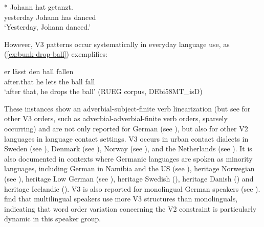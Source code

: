 \documentclass[output=paper,colorlinks,citecolor=brown]{langscibook}
\begin{document}
\begin{exe}
 \ex \label{ex:bunk-Johann-danced} {*} {
  {Johann} {hat} {getanzt.} \\
 yesterday  Johann  has  danced  \\
 \glt \hspace{0.25cm} ‘Yesterday, Johann danced.’ \citep[137]{roberts_extended_2002}
 }
\end{exe}

However, V3 patterns occur systematically in everyday language use, as (\ref{ex:bunk-drop-ball}) exemplifies:  

\begin{exe}
 \ex \label{ex:bunk-drop-ball}
  {er} {lässt} {den} {ball} {fallen} \\
 after.that he lets the ball fall \\
 \glt ‘after that, he drops the ball’ (\nocite{wiese_rueg_2019}RUEG corpus, DEbi58MT\_isD) 
\end{exe}

These instances show an adverbial-subject-finite verb linearization (but see \cite{sluckin_non-canonical_2021} for other V3 orders, such as adverbial-adverbial-finite verb orders, sparsely occurring) and are not only reported for German (see \cite{WieseHeike2013Wcnu}), but also for other V2 languages in language contact settings. V3 occurs in urban contact dialects in Sweden (see \cite{kotsinas_immigrant_1992}), Denmark (see \cite{quist_ny_2000}), Norway (see \cite{opsahl_wolla_2009}), and the Netherlands (see \cite{marieke_meelen_v3_2020}). It is also documented in contexts where Germanic languages are spoken as minority languages, including German in Namibia and the US (see \cite{tracy_it_2010, sewell_sociolinguistic_2015, wiese_hidden_2018}), heritage Norwegian (see \cite{alexiadou_v3_2018, KinnKari2021Pdnp, KinnKari2022Pdih}), heritage Low German (see \cite{rocker_variation_2022}), heritage Swedish (\cite{KinnKari2021Pdnp, KinnKari2022Pdih}), heritage Danish (\cite{KühlKaroline2018WOiA}) and heritage Icelandic (\cite{Arnbjornsdottir2018}). V3 is also reported for monolingual German speakers (see \cite{schalowski_adverbial_2017, wiese_hidden_2018, bunk_aber_2020}). \citet{wiese_hidden_2018} find that multilingual speakers use more V3 structures than monolinguals, indicating that word order variation concerning the V2 constraint is particularly dynamic in this speaker group. 
\end{document}
